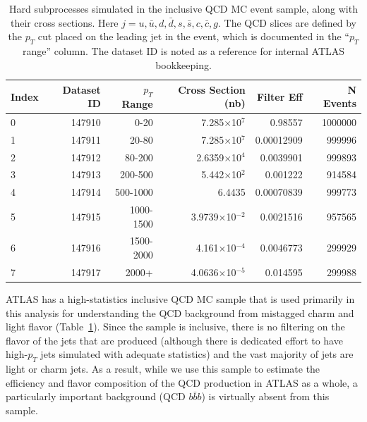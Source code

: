 \begin{table}[h]
 \begin{center}
\caption{Hard subprocesses simulated in the inclusive QCD MC event sample, along with their cross sections. Here
$j=u,\bar{u},d,\bar{d},s,\bar{s},c,\bar{c},g$.  The QCD slices are defined by the $p_T$ cut placed
on the leading jet in the event, which is documented in the ``$p_T$ range'' column.  The dataset
ID is noted as a reference for internal ATLAS bookkeeping.
\label{tab:qcd_mc_parameters}}
    \begin{tabular}{l r r r r r} \hline \hline
    Index & Dataset ID & $p_T$ Range& Cross Section (nb)& Filter Eff   & N Events \\ \hline
    0     &  147910    & 0-20        &  7.285$\times$10$^7$    &   0.98557 & 1000000 \\
    1     &  147911    & 20-80       &  7.285$\times$10$^7$    &   0.00012909 & 999996  \\
    2     &  147912    & 80-200      &  2.6359$\times$10$^4$   &   0.0039901 & 999893 \\
    3     &  147913    & 200-500     &  5.442$\times$10$^2$    &     0.001222 & 914584 \\
    4     &  147914    & 500-1000    &  6.4435                 &   0.00070839 & 999773 \\
    5     &  147915    & 1000-1500   &  3.9739$\times$10$^{-2}$&    0.0021516 & 957565 \\
    6     &  147916    & 1500-2000   &  4.161$\times$10$^{-4}$ &    0.0046773 & 299929 \\
    7     &  147917    & 2000+       &  4.0636$\times$10$^{-5}$&     0.014595 & 299988 \\ \hline
    \end{tabular}
  \end{center}
\end{table}

ATLAS has a high-statistics inclusive QCD MC sample that is used primarily in 
this analysis for understanding the QCD background from 
mistagged charm and light flavor (Table~\ref{tab:qcd_mc_parameters}).  Since 
the sample is inclusive, there is no filtering on the flavor of the jets 
that are produced (although there is dedicated effort to have high-$p_T$ 
jets simulated with adequate statistics) and the vast majority of jets are light or 
charm jets.  As a result, while we use this sample to estimate the 
efficiency and flavor composition of the QCD production in ATLAS as a whole, a 
particularly important background (QCD $b\bar{b}b$) is virtually absent from this sample.


